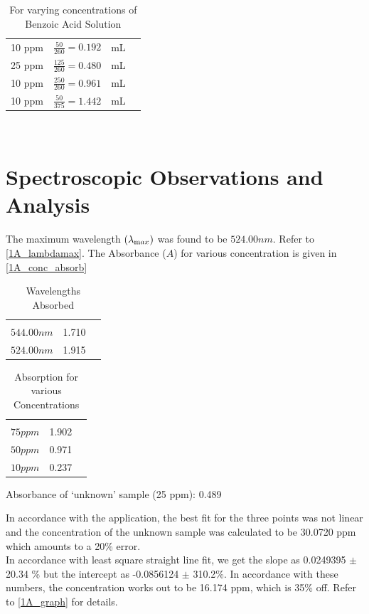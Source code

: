 	\begin{table}
		\myfloatalign
		\begin{tabularx}{\textwidth}{Xlll}
			\hline%
			10 ppm 	&	$\frac{50}{260}=0.192$	&	mL\\
			25 ppm 	&	$\frac{125}{260}=0.480$	&	mL\\
			10 ppm 	&	$\frac{250}{260}=0.961$	&	mL\\
			10 ppm 	&	$\frac{50}{375}=1.442$	&	mL\\ \hline%
		\end{tabularx}\\
		\caption{For varying concentrations of Benzoic Acid Solution}
		\label{1A_vary}
	\end{table}

\section{Spectroscopic Observations and Analysis}
	The maximum wavelength $(\lambda_{\text max})$ was found to be $524.00 nm$. Refer to \autoref{1A_lambdamax}. The Absorbance ($A$) for various concentration is given in \autoref{1A_conc_absorb}
	\begin{table}
		\myfloatalign
		\begin{tabularx}{\textwidth}{Xll}
			\hline
			\tableheadline{Wavelength $(\lambda)$} 	&	\tableheadline{Absorbance}\\
			$544.00 nm$								&	1.710\\
			$524.00 nm$								&	1.915\\		
			\hline
		\end{tabularx}
		\caption{Wavelengths Absorbed}
		\label{1A_lambdamax}
	\end{table}

	\begin{table}
		\myfloatalign
		\begin{tabularx}{\textwidth}{Xll}
			\hline
			\tableheadline{Concentration $(c)$} 	&	\tableheadline{Absorbance}\\
			$75 ppm$								&	1.902\\
			$50 ppm$								&	0.971\\
			$10 ppm$								&	0.237\\
			\hline
		\end{tabularx}
		\caption{Absorption for various Concentrations}
		\label{1A_conc_absorb}
	\end{table}
	Absorbance of `unknown' sample (25 ppm): 0.489
	\par
	In accordance with the application, the best fit for the three points was not linear and the concentration of the unknown sample was calculated to be 30.0720 ppm which amounts to a 20\% error.\\
	In accordance with least square straight line fit, we get the slope as 0.0249395 $\pm$ 20.34 \% but the intercept as -0.0856124 $\pm$ 310.2\%. In accordance with these numbers, the concentration works out to be 16.174 ppm, which is 35\% off. Refer to \autoref{1A_graph} for details. 

